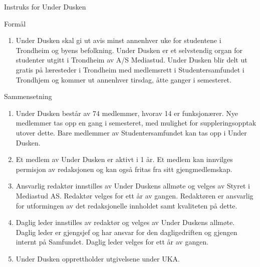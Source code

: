 \begin{instruks*}{Instruks for Under Dusken}

    \begin{instruksledd}{Formål}
        \begin{enumerate}
            \item Under Dusken skal gi ut avis minst annenhver uke for studentene i Trondheim og
                byens befolkning. Under Dusken er et selvstendig organ for studenter utgitt i Trondheim av A/S
                Mediastud. Under Dusken blir delt ut gratis på læresteder i Trondheim med medlemsrett i
                Studentersamfundet i Trondhjem og kommer ut annenhver tirsdag, åtte ganger i semesteret.
        \end{enumerate}
    \end{instruksledd}

    \begin{instruksledd}{Sammensetning}
        \begin{enumerate}
            \item Under Dusken består av 74 medlemmer, hvorav 14 er funksjonærer. Nye medlemmer tas
                opp en gang i semesteret, med mulighet for suppleringsopptak utover dette. Bare medlemmer av
                Studentersamfundet kan tas opp i Under Dusken.
            \item Et medlem av Under Dusken er aktivt i 1 år. Et medlem kan innvilges permisjon av
                redaksjonen og kan også fritas fra sitt gjengmedlemskap.
            \item Ansvarlig redaktør innstilles av Under Duskens allmøte og velges av Styret i
                Mediastud AS. Redaktør velges for ett år av gangen. Redaktøren er ansvarlig for utformingen av det
                redaksjonelle innholdet samt kvaliteten på dette.
            \item Daglig leder innstilles av redaktør og velges av Under Duskens allmøte.
                Daglig leder er gjengsjef og har ansvar for den dagligedriften og gjengen internt på Samfundet.
                Daglig leder velges for ett år av gangen.
            \item Under Dusken opprettholder utgivelsene under UKA.
        \end{enumerate}
    \end{instruksledd}


\end{instruks*}
